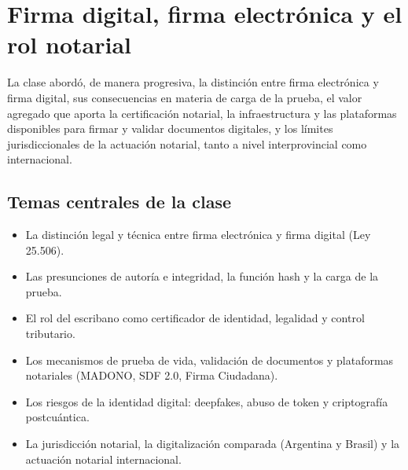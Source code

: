 \documentclass[12pt,oneside]{book}
\begin{document}
\tableofcontents
\clearpage

\chapter{Firma digital, firma electrónica y el rol notarial}

La clase abordó, de manera progresiva, la distinción entre firma electrónica y firma digital, sus consecuencias en materia de carga de la prueba, el valor agregado que aporta la certificación notarial, la infraestructura y las plataformas disponibles para firmar y validar documentos digitales, y los límites jurisdiccionales de la actuación notarial, tanto a nivel interprovincial como internacional.

\section*{Temas centrales de la clase}
\begin{itemize}
    \item La distinción legal y técnica entre firma electrónica y firma digital (Ley 25.506).
    \item Las presunciones de autoría e integridad, la función hash y la carga de la prueba.
    \item El rol del escribano como certificador de identidad, legalidad y control tributario.
    \item Los mecanismos de prueba de vida, validación de documentos y plataformas notariales (MADONO, SDF 2.0, Firma Ciudadana).
    \item Los riesgos de la identidad digital: deepfakes, abuso de token y criptografía postcuántica.
    \item La jurisdicción notarial, la digitalización comparada (Argentina y Brasil) y la actuación notarial internacional.
\end{itemize}
\end{document}
